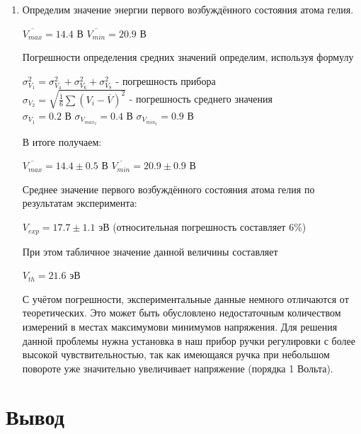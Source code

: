 \documentclass[a4paper, 12pt]{article}%
\begin{document}
\begin{enumerate}
\item Определим значение энергии первого возбуждённого состояния атома гелия. 
\begin{center}
    $\overline{V_{max}} = 14.4$ В \hspace{1cm} $\overline{V_{min}} = 20.9$ В
\end{center}
Погрешности определения средних значений определим, используя формулу
\begin{center}
    $\sigma^2_{V_1} = \sigma^2_{V_4} + \sigma^2_{V_6} + \sigma^2_{V_8}$ - погрешность прибора \\
    $\sigma_{V_2} = \sqrt{\frac{1}{6}\sum (V_i - \overline{V})^2}$ -  погрешность среднего значения \\
    $\sigma_{V_1} = 0.2$ В \hspace{1cm} $\sigma_{V_{max_2}} = 0.4$ В  \hspace{1cm} $\sigma_{V_{min_2}} = 0.9$ В
\end{center}

В итоге получаем:
\begin{center}
    $\overline{V_{max}} = 14.4 \pm 0.5$ В \hspace{1cm} $\overline{V_{min}} = 20.9 \pm 0.9	$ В
\end{center}


Среднее значение первого возбуждённого состояния атома гелия по результатам эксперимента:
\begin{center}
    $V_{exp} = 17.7 \pm 1.1$ эВ (относительная погрешность составляет 6\%)
\end{center}
При этом табличное значение данной величины составляет
\begin{center}
    $V_{th} = 21.6$ эВ
\end{center}

С учётом погрешности, экспериментальные данные немного отличаются от теоретических. Это может быть обусловлено недостаточным количеством измерений в местах максимумови минимумов напряжения. Для решения данной проблемы нужна установка в наш прибор ручки регулировки с более высокой чувствительностью, так как имеющаяся ручка при небольшом повороте уже значительно увеличивает напряжение (порядка 1 Вольта).

\end{enumerate}

\section{Вывод}
\end{document}
